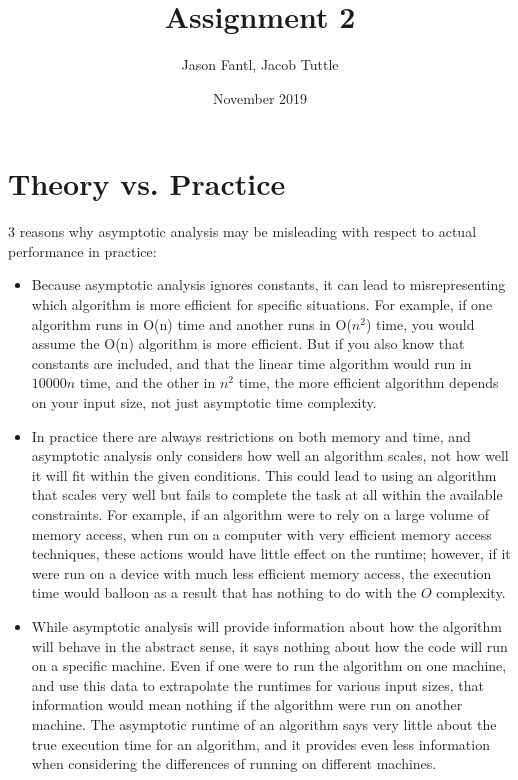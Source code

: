 \documentclass{article}
\title{Assignment 2}
\author{Jason Fantl, Jacob Tuttle}
\date{November 2019}
\begin{document}
\maketitle

\section{Theory vs. Practice}

3 reasons why asymptotic analysis may be misleading with respect to actual performance in practice:
\begin{itemize}
  \item Because asymptotic analysis ignores constants, it can lead to misrepresenting which algorithm is more efficient for specific situations. For example, if one algorithm runs in O(n) time and another runs in O($n^2$) time, you would assume the O(n) algorithm is more efficient. But if you also know that constants are included, and that the linear time algorithm would run in $10000n$ time, and the other in $n^2$ time, the more efficient algorithm depends on your input size, not just asymptotic time complexity.
  \item In practice there are always restrictions on both memory and time, and asymptotic analysis only considers how well an algorithm scales, not how well it will fit within the given conditions. This could lead to using an algorithm that scales very well but fails to complete the task at all within the available constraints. For example, if an algorithm were to rely on a large volume of memory access, when run on a computer with very efficient memory access techniques, these actions would have little effect on the runtime; however, if it were run on a device with much less efficient memory access, the execution time would balloon as a result that has nothing to do with the $O$ complexity.
  \item While asymptotic analysis will provide information about how the algorithm will behave in the abstract sense, it says nothing about how the code will run on a specific machine. Even if one were to run the algorithm on one machine, and use this data to extrapolate the runtimes for various input sizes, that information would mean nothing if the algorithm were run on another machine. The asymptotic runtime of an algorithm says very little about the true execution time for an algorithm, and it provides even less information when considering the differences of running on different machines.
\end{itemize}
\end{document}
